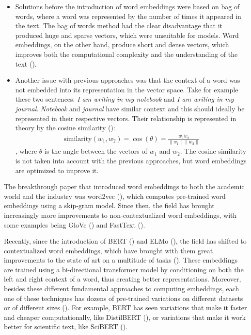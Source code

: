 \documentclass[12pt]{extreport}
\begin{document}
\begin{itemize}
    \item Solutions before the introduction of word embeddings were based on bag of words, where a word was represented by the number of times it appeared in the text. The bag of words method had the clear disadvantage that it produced huge and sparse vectors, which were unsuitable for models. Word embeddings, on the other hand, produce short and dense vectors, which improves both the computational complexity and the understanding of the text (\cite{word-embedding-survey, word2vec}).
    \item Another issue with previous approaches was that the context of a word was not embedded into its representation in the vector space. Take for example these two sentences: \emph{I am writing in my notebook} and \emph{I am writing in my journal}. \emph{Notebook} and \emph{journal} have similar context and this should ideally be represented in their respective vectors. Their relationship is represented in theory by the cosine similarity (\cite{word2vec}): \begin{align}\text{similarity}(w_1, w_2) = \cos(\theta) = \frac{w_1 \dot w_2}{\lVert w_1 \rVert \lVert w_2 \rVert}\end{align}, where $\theta$ is the angle between the vectors of $w_1$ and $w_2$. The cosine similarity is not taken into account with the previous approaches, but word embeddings are optimized to improve it.
\end{itemize}

The breakthrough paper that introduced word embeddings to both the academic world and the industry was word2vec (\cite{word2vec}), which computes pre-trained word embeddings using a skip-gram model. Since then, the field has brought increasingly more improvements to non-contextualized word embeddings, with some examples being GloVe (\cite{glove}) and FastText (\cite{fasttext}).

Recently, since the introduction of BERT (\cite{bert}) and ELMo (\cite{elmo}), the field has shifted to contextualized word embeddings, which have brought with them great improvements to the state of art on a multitude of tasks (\cite{bert}). These embeddings are trained using a bi-directional transformer model by conditioning on both the left and right context of a word, thus creating better representations. Moreover, besides these different fundamental approaches to computing embeddings, each one of these techniques has dozens of pre-trained variations on different datasets or of different sizes (\cite{huggingface}). For example, BERT has seen variations that make it faster and cheaper computationally, like DistilBERT (\cite{distilbert}), or variations that make it work better for scientific text, like SciBERT (\cite{scibert}).
\end{document}
